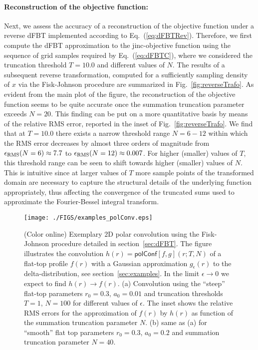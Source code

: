 \documentclass[12pt]{iopart}
\begin{document}
\paragraph{Reconstruction of the objective function:}
Next, we assess the accuracy of a reconstruction of the objective function
under a reverse dFBT implemented according to Eq.~(\ref{eq:dFBTRev}).
Therefore, we first compute the dFBT approximation to the {\rm jinc}-objective
function using the sequence of grid samples required by Eq.~(\ref{eq:dFBTC}),
where we considered the truncation threshold $T=10.0$ and different values of
$N$. The results of a subsequent reverse transformation, computed for a
sufficiently sampling density of $x$ via the Fisk-Johnson procedure are
summarized in Fig.~\ref{fig:reverseTrafo}.  As evident from the main plot of
the figure, the reconstruction of the objective function seems to be quite
accurate once the summation truncation parameter exceeds $N=20$. This finding
can be put on a more quantitative basis by means of the relative RMS error,
reported in the inset of Fig.~\ref{fig:reverseTrafo}. We find that at $T=10.0$
there exists a narrow threshold range $N=6-12$ within which the RMS error
decreases by almost three orders of magnitude from $\epsilon_{\rm
RMS}(N=6)\approx 7.7$ to $\epsilon_{\rm RMS}(N=12)\approx 0.007$. For higher
(smaller) values of $T$, this threshold range can be seen to shift towards
higher (smaller) values of $N$.  This is intuitive since at larger values of
$T$ more sample points of the transformed domain are necessary to capture the
structural details of the underlying function appropriately, thus affecting the
convergence of the truncated sums used to approximate the Fourier-Bessel
integral transform. 

%
%
\begin{figure}[t!]
\centerline{\texttt{[image: ./FIGS/examples\_polConv.eps]} } 
\caption{(Color online) Exemplary $2$D polar convolution using the Fisk-Johnson
procedure detailed in section~\ref{sec:dFBT}. The figure illustrates the 
convolution $h(r) = {\mathsf{polConf}}[f,g](r;T,N)$ of a flat-top profile $f(r)$ with 
a Gaussian approximation $g_\epsilon(r)$ to the delta-distribution, see 
section~\ref{sec:examples}.
In the limit $\epsilon \to 0$ we expect to find $h(r)\to f(r)$.
(a) Convolution using the ``steep'' flat-top parameters $r_0=0.3$, $a_0=0.01$ and truncation
thresholds $T=1$, $N=100$ for different values of $\epsilon$. The inset shows
the relative RMS errors for the approximation of $f(r)$ by $h(r)$ as function 
of the summation truncation parameter $N$. 
(b) same as (a) for ``smooth'' flat top parameters $r_0=0.3$, $a_0=0.2$ and
summation truncation parameter $N=40$. 
}
\label{fig:polConv}
\end{figure}
\end{document}
